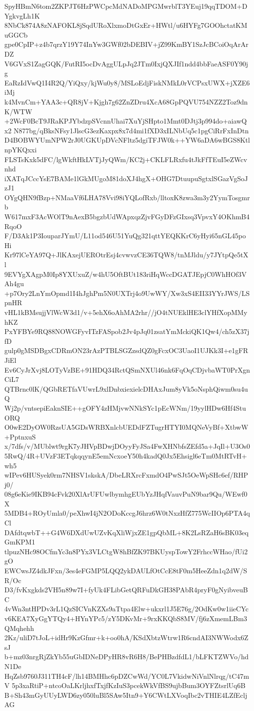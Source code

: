 SpyHBmN6tom2ZKPJT6HzPWCpcMdNADoMPGMwrblT3YEuj19qqTDOM+DYgkvgLh1K
8NbCk874A8zNAFOKL8jSqdURoXlxmoDtGxEr+HWtl/u6HYFg7GOOhctatKMuGGCb
gpe0CpIP+z4b7qrzY19Y74InYw3GWf02bDEBIV+jZ99KmBY1SzJcBCoiOqArArDZ
V6GVxS1ZagGQK/FutRI5ocDvAggULpJq2JTm0IxjQXJIf1ndd4bbFaeASF0Y90jg
EaRzIdVwQ1I4R2Q/YiQxy/kjWu0y8/MSLoEdjFiskNMkL0rVCPsxUWX+jXZE6iMj
k4MvnCm+YAA3c+QR8jV+Kjgh7g62ZnZDru4XcA68GpPQVU754NZZ2Toz9dnK/WTW
+2WcF0BcT9JRaKPJYbdzpSVcnnUhai7XuYjSHpto1Mmt0DJtj3p994do+aiawQx2
N877bg/qBksNFsy1JlscG3ezKaxpx8x7d4mi1fXD3xILNbUq5c1pgCiRrFxInDtn
D4BOBWYUmNPW2rJ0UGKUpDVcNFltz5dgiTFJW0k++YW6aDA6wBGS8KtlnpYKQxxi
FLSTsKxk5dFC/lgWkftHkLVTjJyQWm/KC2j+CKLFLRxfu4tJkFfTEuI5eZWcvnhd
iXATqJCccYsE7BAMe1lGkMUgoM81doXJ4hgX+OHG7DtuupuSgtxlSGazVgSoJzJ1
OYgQHN9fBzp+NMaaVf6LHA78Vvi98iYQLofRxb/lltoxK8zwa3m3y2YymTosgmrb
W617mxF3AcWOlT9nAexB5bgzbUdWApxqzZjvFGyDFzGIxsq3VpvxY4OKhmB4RqoO
F/D3Ak1P3IouparJYmU/L11od546U51YuQg321qttYEQKKrC6yHyi65nGL45poHi
Kr97lCeYA97Q+JlKAxejUEROtrEsj4cvwvzCE36TQW8/tnMJldu/y7JYtpQe5tXl
9EVYgXAgpM0Ip8YXUxuZ/w4hU5OftBUt183riHqWccDGATJEpjC0WhHOf3VAh4gu
+p7Ory2LnYmOpmd1I4hJghPm5N0UXTrj4o9UwWY/Xw3xS4EII33YYrJWS/LSpnHR
vHL1kBMsujjVlWcW3d1/v+5ehX6oAhMA2rhr//jO4tNUEklHE3clYHfXopMMyhKZ
PxYFBYe9RQ88NOWGFyvITzFASpob2Jv4pJq01zsatYmMckiQK1Qw4/ch5zX37jfD
gulp0gMSDBgxCDRmON23rAzPTBLSGZzsdQZ0gFcxOC3UaoI1UJKk3I+e1gFRJiEl
Ev6CyJrXvj8LOTyVzBE+91HDQ34RctQSmNXUl46nk6FqOqCDjvbaWT0PrXgnCiL7
QTBrnc0lK/QGbRETfaVUwrL9xlDnbxiexielcDHAxJum8yVk5oNsphQiwm0su4uQ
Wj2p/vntsepiEaknSIE++gOFY4zHMjvwNNkSYc1pEcWNm/19yylHDw6Hf4StuORQ
O0wE2DyOW0RzsUA5GDsWRBXnlcbUEDdFZTugrHTYI0MQNeVyBf+XtbwW+PptnxuS
x/7dfs/v/MUblwt9rgK7yJHVpBDwjDOyyFyJSa4FwXHNbfsZEfd5a+JqIl+U3Os0
5RwQ/4R+UVzF3ETqkqqynE5emNcxoeY50h4kadQ0Jx5Ehsigl6eTm0MtRTvH+wh5
wIPev6HUSyek0rm7NHSV1skskA/DbeLRXrcFxmdO4PwSJt5OeWpSHc6ef/RHPj0/
08g6eKie9IKB94cFvk20XlArUFUwlbymhgEUbYzJHqfVauvPuN9bar9Qu/WEwf0X
5MDB4+ROyUmla0/peXhwI4jN2ODoKccgJ6hrz6W0tNxzHfZ775WcIIOp6PTA4qCl
DAfdtqwbT++G4W6DXdUwUZvKqXliWjxZE1gpQbML+8K2LsRZaH6sBK03eqGmKPM1
tlpuzNHc98OCfmYc3n8PYx3VLCtgW8hBfZK97BKUyspTowY2FrhccWHao/fUi2gO
EWCwsJZ4dkJFxn/3es4eFGMP5LQQ2ykDAULfOtCcE8tF0m5HeeZdn1q2dW/SR/Oc
D3/fvKxgkds2VH5n89w7I+fyUk4FLibGetQRFuDkGH38PAbR4pryF0gNyibveuBC
4vWn3ntHPDv3rL1QzSICVnKZXs9aTtpa4Elw+ukxrl1J5E76g/2OdKw0w1iieCYc
v6KEA7XyGgYTQy4+HYnYPc5/zY5DKvMr+9rxKKQbS8MV/fj6zXmemLBm3QMqhehh
2Kz/uliD7tJoL+idHr9KzGfmr+k+oo0hA/KSdXbtzWtrw1R6cndAI3NWWodx6ZsJ
b+mz03nrgRjZkYb55uGbIDNeDPyHR8vR6H8/BePHBzdfdL1/bLFKTZWVo/hdN1De
HqZsb9760J311TH4cF/lh14BMHhc6pDZCwWd/YC0L7VkidwNiVnlNlrqg/tC47mV
5p3xaRtiP+ntcoOaLKrljhxfTxjfKzIuS3pcekWkVfBS9ujbBum3OYFZtsrlUq6B
B+Sh43mGyUUyLWD6zy050luBl5SAw5Itn9+Y6CWtLXVoqIbc2vTHIE4LZfEcljAG
